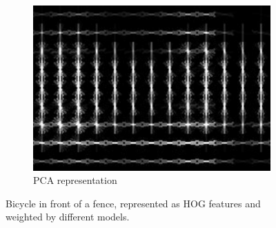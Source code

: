 \begin{figure}
\begin{subfigure}[b]{0.3\textwidth}
\includegraphics[width=\textwidth]{images/whitened_hog_pca}
\caption[PCA representation]{\acs{PCA} representation}
\label{fig:whitened_hog:pca}
\end{subfigure}
\caption{Bicycle in front of a fence, represented as \ac{HOG} features and weighted by different models.}
\label{fig:whitened_hog}
\end{figure}

\FloatBarrier
